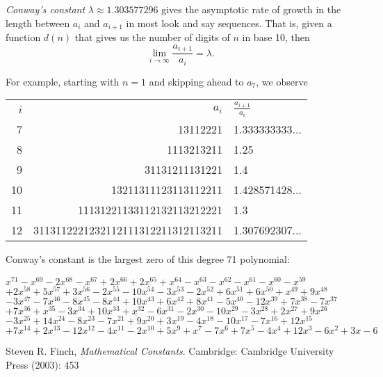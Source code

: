 \documentclass[12pt]{article}
\begin{document}
{\em Conway's constant} $\lambda \approx 1.303577296$ gives the asymptotic rate of growth in the length between $a_i$ and $a_{i + 1}$ in most look and say sequences. That is, given a function $d(n)$ that gives us the number of digits of $n$ in base 10, then $$\lim_{i \to \infty} \frac{a_{i + 1}}{a_i} = \lambda.$$

For example, starting with $n = 1$ and skipping ahead to $a_7$, we observe

\begin{tabular}{|r|r|l|}
$i$ & $a_i$ & $\frac{a_{i + 1}}{a_i}$ \\
 7 &                           13112221 & 1.333333333... \\
 8 &                         1113213211 & 1.25 \\
 9 &                     31131211131221 & 1.4 \\
10 &               13211311123113112211 & 1.428571428... \\
11 &         11131221133112132113212221 & 1.3 \\
12 & 3113112221232112111312211312113211 & 1.307692307... \\
\end{tabular}

Conway's constant is the largest zero of this degree 71 polynomial:

$x^{71} - x^{69} - 2x^{68} - x^{67} + 2x^{66} + 2x^{65} + x^{64} - x^{63} - x^{62} - x^{61} - x^{60} - x^{59}$
$+  2x^{58} + 5x^{57} + 3x^{56} - 2x^{55} - 10x^{54} - 3x^{53} - 2x^{52} + 6x^{51} + 6x^{50} + x^{49} + 9x^{48}$
$- 3x^{47} -  7x^{46} - 8x^{45} - 8x^{44} + 10x^{43} + 6x^{42} + 8x^{41} - 5x^{40} - 12x^{39} + 7x^{38} - 7x^{37}$
$+ 7x^{36} + x^{35} -  3x^{34} + 10x^{33} + x^{32} - 6x^{31} - 2x^{30} - 10x^{29} - 3x^{28} + 2x^{27} + 9x^{26}$
$- 3x^{25} + 14x^{24} - 8x^{23} -  7x^{21} + 9x^{20} + 3x^{19} - 4x^{18} - 10x^{17} - 7x^{16} + 12x^{15}$
$+ 7x^{14} + 2x^{13} - 12x^{12} - 4x^{11} -  2x^{10} + 5x^9 + x^7 - 7x^6 + 7x^5 - 4x^4 + 12x^3 - 6x^2 + 3x - 6$

\begin{thebibliography}{1}
 Steven R. Finch, {\it Mathematical Constants}. Cambridge: Cambridge University Press (2003): 453
\end{thebibliography}
\end{document}
